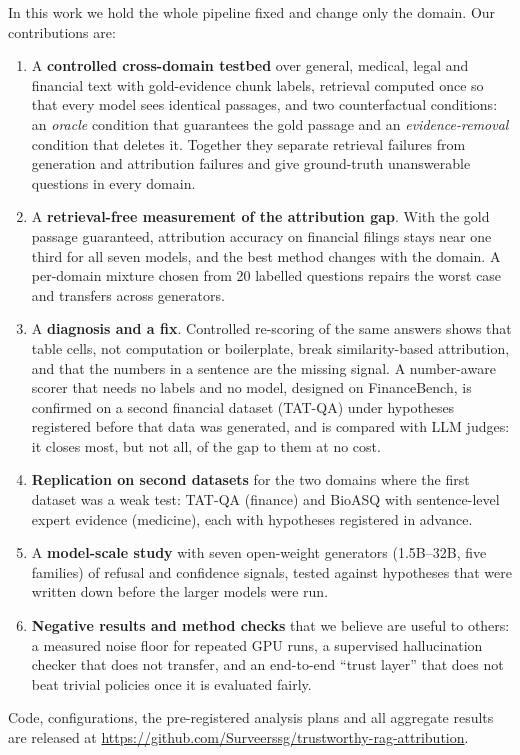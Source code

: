 \documentclass[conference]{IEEEtran}
\begin{document}
In this work we hold the whole pipeline fixed and change only the domain. Our contributions are:
\begin{enumerate}
\item A \textbf{controlled cross-domain testbed} over general, medical, legal and financial text with gold-evidence chunk labels, retrieval computed
once so that every model sees identical passages, and two counterfactual conditions: an \emph{oracle} condition that guarantees the gold passage and
an \emph{evidence-removal} condition that deletes it. Together they separate retrieval failures from generation and attribution failures and give
ground-truth unanswerable questions in every domain.
\item A \textbf{retrieval-free measurement of the attribution gap}. With the gold passage guaranteed, attribution accuracy on financial filings stays
near one third for all seven models, and the best method changes with the domain. A per-domain mixture chosen from 20 labelled questions repairs the
worst case and transfers across generators.
\item A \textbf{diagnosis and a fix}. Controlled re-scoring of the same answers shows that table cells, not computation or boilerplate, break
similarity-based attribution, and that the numbers in a sentence are the missing signal. A number-aware scorer that needs no labels and no model,
designed on FinanceBench, is confirmed on a second financial dataset (TAT-QA) under hypotheses registered before that data was generated, and is
compared with LLM judges: it closes most, but not all, of the gap to them at no cost.
\item \textbf{Replication on second datasets} for the two domains where the first dataset was a weak test: TAT-QA (finance) and BioASQ with
sentence-level expert evidence (medicine), each with hypotheses registered in advance.
\item A \textbf{model-scale study} with seven open-weight generators (1.5B--32B, five families) of refusal and confidence signals, tested against
hypotheses that were written down before the larger models were run.
\item \textbf{Negative results and method checks} that we believe are useful to others: a measured noise floor for repeated GPU runs, a supervised
hallucination checker that does not transfer, and an end-to-end ``trust layer'' that does not beat trivial policies once it is evaluated fairly.
\end{enumerate}
Code, configurations, the pre-registered analysis plans and all aggregate results are released at
\url{https://github.com/Surveerssg/trustworthy-rag-attribution}.
\end{document}
